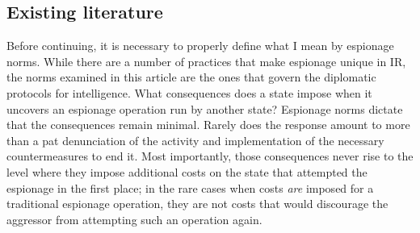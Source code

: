 \documentclass[14pt]{extarticle}
\begin{document}
\subsection{Existing literature}
Before continuing, it is necessary to properly define what I mean by espionage norms. While there are a number of practices that make espionage unique in IR, the norms examined in this article are the ones that govern the diplomatic protocols for intelligence. What consequences does a state impose when it uncovers an espionage operation run by another state? Espionage norms dictate that the consequences remain minimal. Rarely does the response amount to more than a pat denunciation of the activity and implementation of the necessary countermeasures to end it. Most importantly, those consequences never rise to the level where they impose additional costs on the state that attempted the espionage in the first place; in the rare cases when costs \emph{are} imposed for a traditional espionage operation, they are not costs that would discourage the aggressor from attempting such an operation again.
\end{document}
